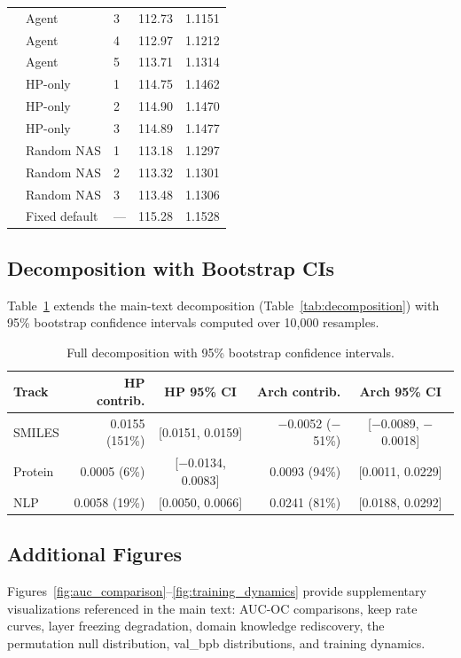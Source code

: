 \begin{table}[h]
\begin{tabular}{@{}lllrr@{}}
& Agent & 3 & 112.73 & 1.1151 \\
& Agent & 4 & 112.97 & 1.1212 \\
& Agent & 5 & 113.71 & 1.1314 \\
& HP-only & 1 & 114.75 & 1.1462 \\
& HP-only & 2 & 114.90 & 1.1470 \\
& HP-only & 3 & 114.89 & 1.1477 \\
& Random NAS & 1 & 113.18 & 1.1297 \\
& Random NAS & 2 & 113.32 & 1.1301 \\
& Random NAS & 3 & 113.48 & 1.1306 \\
& Fixed default & --- & 115.28 & 1.1528 \\
\bottomrule
\end{tabular}
\end{table}

\subsection{Decomposition with Bootstrap CIs}

Table~\ref{tab:decomposition_full} extends the main-text decomposition (Table~\ref{tab:decomposition}) with 95\% bootstrap confidence intervals computed over 10{,}000 resamples.

\begin{table}[h]
\centering
\caption{Full decomposition with 95\% bootstrap confidence intervals.}
\label{tab:decomposition_full}
\small
\begin{tabular}{@{}lrcrc@{}}
\toprule
\textbf{Track} & \textbf{HP contrib.} & \textbf{HP 95\% CI} & \textbf{Arch contrib.} & \textbf{Arch 95\% CI} \\
\midrule
SMILES & 0.0155 (151\%) & [0.0151, 0.0159] & $-$0.0052 ($-$51\%) & [$-$0.0089, $-$0.0018] \\
Protein & 0.0005 (6\%) & [$-$0.0134, 0.0083] & 0.0093 (94\%) & [0.0011, 0.0229] \\
NLP & 0.0058 (19\%) & [0.0050, 0.0066] & 0.0241 (81\%) & [0.0188, 0.0292] \\
\bottomrule
\end{tabular}
\end{table}

\subsection{Additional Figures}

Figures~\ref{fig:auc_comparison}--\ref{fig:training_dynamics} provide supplementary visualizations referenced in the main text: AUC-OC comparisons, keep rate curves, layer freezing degradation, domain knowledge rediscovery, the permutation null distribution, val\_bpb distributions, and training dynamics.

